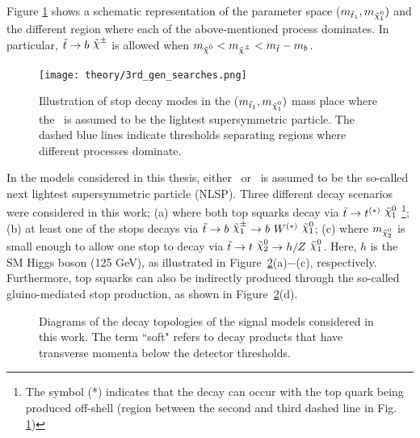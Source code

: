 				\noindent Figure \ref{fig:stop_topologies} shows a schematic representation of the parameter space ($m_{\stopone}, m_{\ninoone})$ and the different region where each of the above-mentioned process dominates. In particular, $\stop \ra b\ \chinopm$ is allowed when $m_{\nino} < m_{\chinopm} < \mstop - m_b$. 

				\begin{figure}[!htb]
					\centering
					\texttt{[image: theory/3rd\_gen\_searches.png]}
					\caption{\label{fig:stop_topologies} Illustration of stop decay modes in the ($m_{\stopone}, m_{\ninoone})$ mass place where the \ninoone\ is assumed to be the lightest supersymmetric particle. The dashed blue lines indicate thresholds separating regions where different processes dominate.}
				\end{figure}

				In the models considered in this thesis, either \ninotwo\ or \chinoonepm\ is assumed to be the so-called next lightest supersymmetric particle (NLSP). Three different decay scenarios were considered in this work; (a) where both top squarks decay via $\stop\rightarrow t^{(*)}\ \ninoone$ \footnote{The symbol (*) indicates that the decay can occur with the top quark being produced off-shell (region between the second and third dashed line in Fig. \ref{fig:stop_topologies})}; (b) at least one of the stops decays via $\stop\rightarrow b\ \chinoonepm \rightarrow b\ \Wboson^{(*)}\ \ninoone$; (c) where $m_{\ninotwo}$ is small enough to allow one stop to decay via $\stop\to t\ \ninotwo \to h/Z\ \ninoone$. Here, $h$ is the SM Higgs boson (125 GeV), as illustrated in 
				Figure~\ref{fig:feynDiagModels}(a)$-$(c), respectively. Furthermore, top squarks can also be indirectly produced through the so-called gluino-mediated stop production, as shown in Figure~\ref{fig:feynDiagModels}(d). 				


				\begin{figure}[!htb]
					\begin{center}
						\hspace{0.05\textwidth}
						\hspace{0.05\textwidth}
						\hspace{0.05\textwidth}
						\hspace{0.05\textwidth}
					\end{center}
					\caption{Diagrams of the decay topologies of the signal models considered in this work. The term ``soft" refers to decay products that have transverse momenta below the detector thresholds.}
					\label{fig:feynDiagModels}
				\end{figure}				


